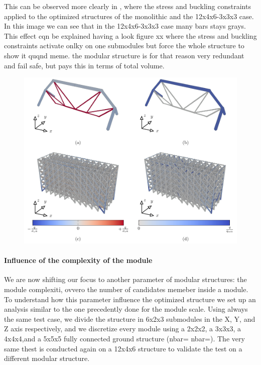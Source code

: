     This can be observed more clearly in , where the stress and buckling constraints applied to the optimized structures of the monolithic and the 12x4x6-3x3x3 case. In this image we can see that in the 12x4x6-3x3x3 case many bars stays grays. This effect cqn be explained having a look figure xx where the stress and buckling constraints activate onlky on one submodules but force the whole structure to show it quqnd meme. the modular structure is for that reason very redundant and fail safe, but pays this in terms of total volume.
    
    \begin{figure}
        \centering
        \includegraphics[width=\linewidth]{figures/05_cellular_opt/00_module_scale_failure/12x4x6_mech.pdf}
        \caption{}
        \label{fig:05_scale_failure}
    \end{figure}

\paragraph{Influence of the complexity of the module}
We are now shifting our focus to another parameter of modular structures: the module complexiti, ovvero the number of candidates memeber inside a module. To understand how this parameter influence the optimized structure we set up an analysis similar to the one precedently done for the module scale. Using always the same test case, we divide the structure in 6x2x3 submodules in the X, Y, and Z axis respectively, and we discretize every module using a 2x2x2, a 3x3x3, a 4x4x4,and a 5x5x5 fully connected ground structure (nbar= nbar=). The very same thest is conducted again on a 12x4x6 structure to validate the test on a different modular structure.

